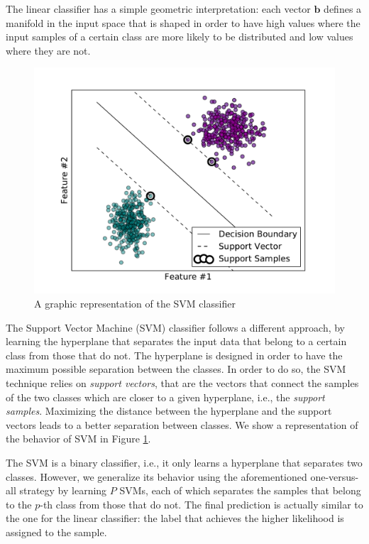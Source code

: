 The linear classifier has a simple geometric interpretation: each vector $\mathbf{b}$ defines a manifold in the input space that is  shaped in order to have high values where the input samples of a certain class are more likely to be distributed and low values where they are not. 

\begin{figure}[tbp]
	\begin{center}
		\includegraphics[width=12cm]{img/ML/ML_SVM}
	\end{center}
	\caption{A graphic representation of the SVM classifier}
	\label{fig:ML:SVM}
\end{figure}

The Support Vector Machine (SVM) classifier follows a different approach, by learning the hyperplane that separates the input data that belong to a certain class from those that do not. The hyperplane is designed in order to have the maximum possible separation between the classes. In order to do so, the SVM technique relies on \textit{support vectors}, that are the vectors that connect the samples of the two classes which are closer to a given hyperplane, i.e., the \textit{support samples}. Maximizing the distance between the hyperplane and the support vectors leads to a better separation between classes. We show a representation of the behavior of SVM in Figure \ref{fig:ML:SVM}.

The SVM is a binary classifier, i.e., it only learns a hyperplane that separates two classes. However, we generalize its behavior using the aforementioned one-versus-all strategy by learning $P$ SVMs, each of which separates the samples that belong to the $p$-th class from those that do not. The final prediction is actually similar to the one for the linear classifier: the label that achieves the higher likelihood is assigned to the sample.

